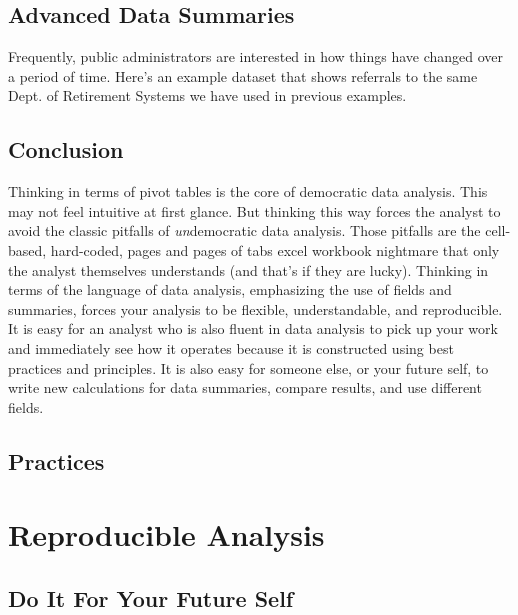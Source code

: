\documentclass[]{book}
\begin{document}
\hypertarget{advanced-data-summaries}{%
\section{Advanced Data Summaries}\label{advanced-data-summaries}}

Frequently, public administrators are interested in how things have changed over a period of time. Here's an example dataset that shows referrals to the same Dept. of Retirement Systems we have used in previous examples.

\hypertarget{conclusion-1}{%
\section{Conclusion}\label{conclusion-1}}

Thinking in terms of pivot tables is the core of democratic data analysis. This may not feel intuitive at first glance. But thinking this way forces the analyst to avoid the classic pitfalls of \emph{un}democratic data analysis. Those pitfalls are the cell-based, hard-coded, pages and pages of tabs excel workbook nightmare that only the analyst themselves understands (and that's if they are lucky). Thinking in terms of the language of data analysis, emphasizing the use of fields and summaries, forces your analysis to be flexible, understandable, and reproducible. It is easy for an analyst who is also fluent in data analysis to pick up your work and immediately see how it operates because it is constructed using best practices and principles. It is also easy for someone else, or your future self, to write new calculations for data summaries, compare results, and use different fields.

\hypertarget{practices}{%
\section{Practices}\label{practices}}

\hypertarget{reproducible-analysis}{%
\chapter{Reproducible Analysis}\label{reproducible-analysis}}

\hypertarget{do-it-for-your-future-self}{%
\section{Do It For Your Future Self}\label{do-it-for-your-future-self}}
\end{document}
